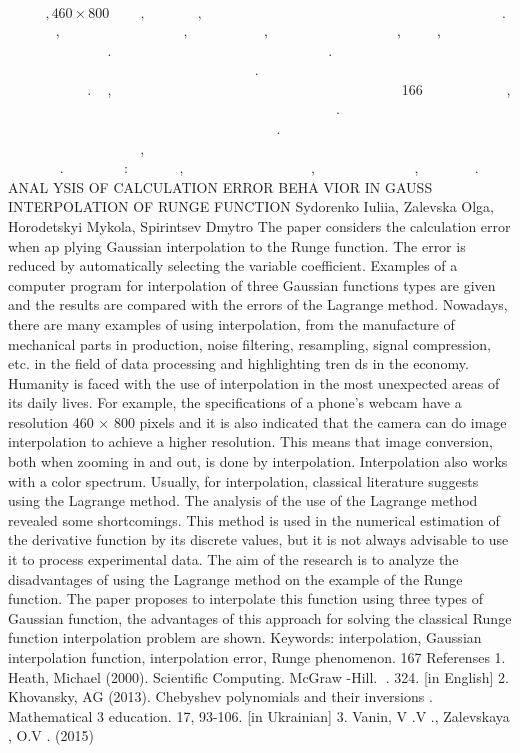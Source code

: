 \documentclass[12pt,a4paper]{article}
\begin{document}
\par
\[￿￿￿￿￿￿￿￿, 460 \times 800￿￿￿￿￿￿￿￿, ￿￿￿￿￿￿￿￿￿￿￿￿￿, ￿￿￿￿￿￿￿￿￿￿￿￿￿￿￿￿￿￿￿￿￿￿￿￿￿￿￿￿￿￿￿￿￿￿￿￿￿￿￿￿￿￿￿￿￿￿￿￿￿￿￿￿￿￿￿￿￿￿￿￿￿￿￿￿￿￿￿￿￿￿￿￿￿￿￿￿.\]
￿￿￿ ￿￿￿￿￿￿￿￿, ￿￿￿ ￿￿￿￿￿￿￿￿￿￿￿￿￿￿ ￿￿￿￿￿￿￿￿￿￿￿, ￿￿￿ ￿￿￿ ￿￿￿￿￿￿￿￿￿￿, ￿￿￿ ￿ ￿￿￿ ￿￿￿￿￿￿￿￿￿￿ ￿￿￿￿￿￿￿￿￿￿, ￿￿￿￿￿￿￿￿, ￿￿￿￿￿￿￿￿￿￿￿￿ ￿￿￿￿￿￿￿￿￿￿￿ ￿￿￿ ￿￿￿￿￿￿￿￿￿. ￿￿￿￿￿￿￿￿￿￿￿￿￿￿￿￿ ￿￿￿￿￿￿￿￿ ￿￿￿￿￿ ￿ ￿ ￿￿￿￿￿￿￿￿ ￿￿￿￿￿￿￿￿. ￿￿￿￿￿￿ ￿￿￿ ￿￿￿￿￿￿￿￿￿￿ ￿￿￿￿￿￿￿￿￿￿￿￿ ￿￿￿￿￿￿￿￿￿￿￿￿ ￿￿￿￿￿￿￿￿￿￿ ￿￿￿￿￿￿￿￿￿￿ ￿￿￿￿￿￿￿￿￿￿￿￿ ￿￿￿￿￿ ￿￿￿￿￿￿￿￿. ￿￿￿ ￿￿￿￿￿￿￿ ￿￿￿￿￿￿￿￿￿￿￿￿￿ ￿￿￿￿￿￿ ￿￿￿￿￿￿￿￿ ￿￿￿￿ ￿￿￿￿￿￿￿￿￿￿ ￿￿￿￿￿￿￿￿￿ ￿￿￿￿￿￿￿￿￿￿. ￿￿￿, ￿￿￿￿ ￿￿￿￿￿ ￿￿￿￿￿￿￿￿￿￿￿￿ ￿￿￿ ￿￿￿￿￿￿￿￿￿ ￿￿￿￿￿￿ ￿￿￿￿￿￿￿￿￿￿￿ ￿￿￿￿￿￿￿ ￿￿ ￿￿ 166 ￿￿￿￿￿￿￿￿￿￿ ￿￿￿￿￿￿￿￿￿, ￿￿ ￿￿￿ ￿￿￿￿￿￿￿￿￿ ￿￿￿￿￿￿￿￿￿￿￿￿￿￿￿￿￿ ￿￿￿￿￿￿ ￿￿ ￿￿￿￿￿￿ ￿￿￿￿￿￿￿￿￿￿￿￿￿ ￿￿￿ ￿￿￿￿￿￿￿￿￿￿￿￿. ￿￿￿￿￿ ￿￿￿￿￿￿￿￿￿￿￿￿ ￿￿￿￿￿￿￿￿ ￿￿￿￿￿￿ ￿￿￿￿￿￿￿￿￿￿￿ ￿￿￿￿￿￿￿￿￿￿￿￿￿ ￿￿￿￿￿￿ ￿￿￿￿￿￿￿￿ ￿￿ ￿￿￿￿￿ ￿￿ ￿￿￿￿￿￿￿ ￿￿￿￿￿. ￿ ￿￿￿￿￿￿ ￿￿￿￿￿￿￿￿￿￿ ￿￿￿￿￿￿￿￿￿￿￿￿￿￿￿ ￿￿￿ ￿￿￿￿￿￿￿ ￿ ￿￿￿￿￿￿￿ ￿￿￿￿ ￿￿￿￿￿ ￿￿￿￿￿￿￿ ￿￿￿￿￿￿, ￿￿￿￿￿￿￿￿ ￿￿￿￿￿￿￿￿￿￿￿￿ ￿￿￿￿￿ ￿￿￿￿￿￿￿ ￿￿￿ ￿￿￿￿￿￿￿ ￿￿￿￿￿￿￿￿￿￿￿￿ ￿￿￿￿￿￿ ￿￿￿￿￿￿￿￿￿￿￿￿￿￿￿￿ ￿￿￿￿￿￿￿ ￿￿￿￿￿. ￿￿￿￿￿￿￿￿ ￿￿￿￿￿: ￿￿￿￿￿￿￿￿￿￿￿￿, ￿￿￿￿￿￿￿￿￿￿￿￿￿￿￿￿ ￿￿￿￿￿￿￿ ￿￿￿￿￿￿, ￿￿￿￿￿￿￿￿￿￿￿ ￿￿￿￿￿￿￿￿￿￿￿￿, ￿￿￿￿￿￿￿ ￿￿￿￿￿. ANAL YSIS OF CALCULATION ERROR BEHA VIOR IN GAUSS INTERPOLATION OF RUNGE FUNCTION Sydorenko Iuliia, Zalevska Olga, Horodetskyi Mykola, Spirintsev Dmytro The paper considers the calculation error when ap plying Gaussian interpolation to the Runge function. The error is reduced by automatically selecting the variable coeﬀicient. Examples of a computer program for interpolation of three Gaussian functions types are given and the results are compared with the errors of the Lagrange method. Nowadays, there are many examples of using interpolation, from the manufacture of mechanical parts in production, noise filtering, resampling, signal compression, etc. in the field of data processing and highlighting tren ds in the economy. Humanity is faced with the use of interpolation in the most unexpected areas of its daily lives. For example, the specifications of a phone's webcam have a resolution 460 × 800 pixels and it is also indicated that the camera can do image interpolation to achieve a higher resolution. This means that image conversion, both when zooming in and out, is done by interpolation. Interpolation also works with a color spectrum. Usually, for interpolation, classical literature suggests using the Lagrange method. The analysis of the use of the Lagrange method revealed some shortcomings. This method is used in the numerical estimation of the derivative function by its discrete values, but it is not always advisable to use it to process experimental data. The aim of the research is to analyze the disadvantages of using the Lagrange method on the example of the Runge function. The paper proposes to interpolate this function using three types of Gaussian function, the advantages of this approach for solving the classical Runge function interpolation problem are shown. Keywords: interpolation, Gaussian interpolation function, interpolation error, Runge phenomenon. 167 Referenses 1. Heath, Michael (2000). Scientific Computing. McGraw -Hill. ￿. 324. [in English] 2. Khovansky, AG (2013). Chebyshev polynomials and their inversions . Mathematical 3 education. 17, 93-106. [in Ukrainian] 3. Vanin, V .V ., Zalevskaya , O.V . (2015) 
\end{document}
